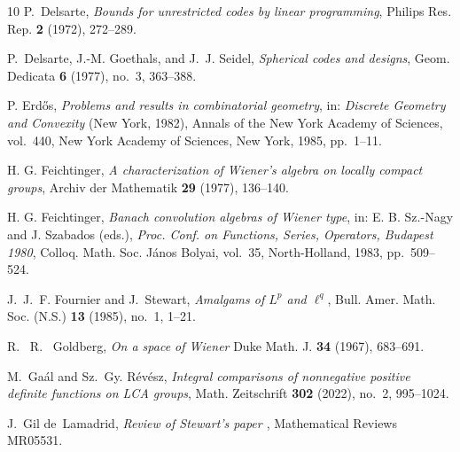 \documentclass[[a4paper,english,12pt]{amsart}
\theoremstyle{plain}
\theoremstyle{remark}
\begin{document}
\begin{thebibliography}{10}
P.~Delsarte, \emph{Bounds for unrestricted codes by linear programming},
  Philips Res. Rep. \textbf{2} (1972), 272--289.

P.~Delsarte, J.-M. Goethals, and J.~J. Seidel, \emph{Spherical codes and
  designs}, Geom. Dedicata \textbf{6} (1977), no.~3, 363--388.


P. Erd\H{o}s,
\emph{Problems and results in combinatorial geometry},
in: \emph{Discrete Geometry and Convexity} (New York, 1982),
Annals of the New York Academy of Sciences, vol.~440,
New York Academy of Sciences, New York, 1985, pp.~1--11.

H. G. Feichtinger,
\emph{A characterization of Wiener's algebra on locally compact groups},
Archiv der Mathematik \textbf{29} (1977), 136--140.

H. G. Feichtinger,
\emph{Banach convolution algebras of Wiener type},
in: E. B. Sz.-Nagy and J. Szabados (eds.),
\emph{Proc. Conf. on Functions, Series, Operators, Budapest 1980},
Colloq. Math. Soc. János Bolyai, vol.~35,
North-Holland, 1983, pp.~509--524.


J.~J.~F. Fournier and J.~Stewart,
\emph{Amalgams of $L^p$ and $\ell^q$},
Bull. Amer. Math. Soc. (N.S.) \textbf{13} (1985), no.~1, 1--21.

R.~ R.~ Goldberg, \emph{On a space of Wiener}
Duke Math. J. \textbf{34} (1967), 683--691.



M.~Gaál and Sz.~Gy. Révész, \emph{Integral comparisons of nonnegative
  positive definite functions on {LCA} groups}, Math. Zeitschrift \textbf{302}
  (2022), no.~2, 995--1024.

J.~Gil de~Lamadrid, \emph{Review of Stewart's paper \cite{Stewart1979}}, Mathematical Reviews MR05531.



\end{thebibliography}
\end{document}

